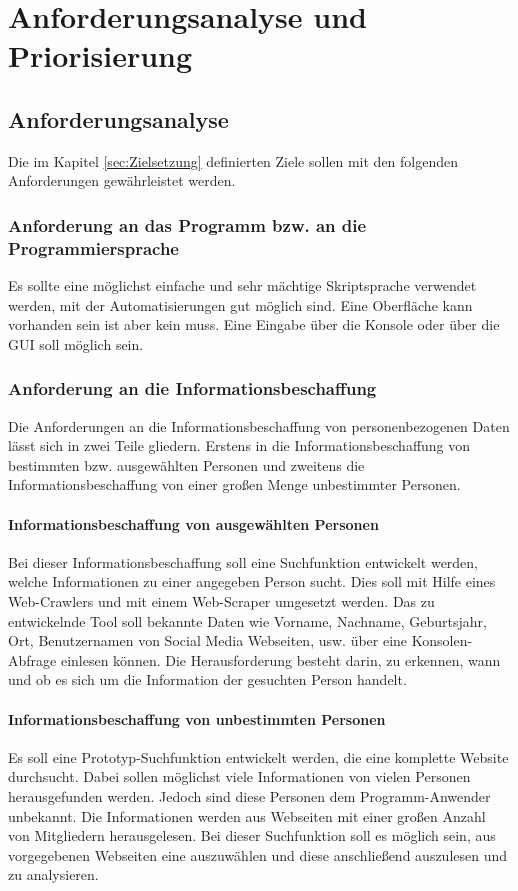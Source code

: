 
\chapter{Anforderungsanalyse und Priorisierung}  %
\label{cha:Anforderungsanalyse und Prioriesierung} %
\section{Anforderungsanalyse} %
\label{sec:Anforderunsanalyse} %
Die im Kapitel \ref{sec:Zielsetzung} definierten Ziele sollen mit den folgenden Anforderungen gewährleistet werden.
	\subsection{Anforderung an das Programm bzw. an die Programmiersprache}
	Es sollte eine möglichst einfache und sehr mächtige Skriptsprache verwendet werden, mit der Automatisierungen gut möglich sind. Eine Oberfläche kann vorhanden sein ist aber kein muss. Eine Eingabe über die Konsole oder über die GUI soll möglich sein. %
	\subsection{Anforderung an die Informationsbeschaffung}
	Die Anforderungen an die Informationsbeschaffung von personenbezogenen Daten lässt sich in zwei Teile gliedern. Erstens in die Informationsbeschaffung von bestimmten bzw. ausgewählten Personen und zweitens die Informationsbeschaffung von einer großen Menge unbestimmter Personen.
	
		\subsubsection{Informationsbeschaffung von ausgewählten Personen}
		Bei dieser Informationsbeschaffung soll eine Suchfunktion entwickelt werden, welche Informationen zu einer angegeben Person sucht. Dies soll mit Hilfe eines Web-Crawlers und mit einem Web-Scraper umgesetzt werden. Das zu entwickelnde Tool soll bekannte Daten wie Vorname, Nachname, Geburtsjahr, Ort, Benutzernamen von Social Media Webseiten, usw. über eine Konsolen-Abfrage einlesen können. Die Herausforderung besteht darin, zu erkennen, wann und ob es sich um die Information der gesuchten Person handelt.
	
		\subsubsection{Informationsbeschaffung von unbestimmten Personen}
		Es soll eine Prototyp-Suchfunktion entwickelt werden, die eine komplette Website durchsucht. Dabei sollen möglichst viele Informationen von vielen Personen herausgefunden werden. Jedoch sind diese Personen dem Programm-Anwender unbekannt. Die Informationen werden aus Webseiten mit einer großen Anzahl von Mitgliedern herausgelesen. Bei dieser Suchfunktion soll es möglich sein, aus vorgegebenen Webseiten eine auszuwählen und diese anschließend auszulesen und zu analysieren.
		
